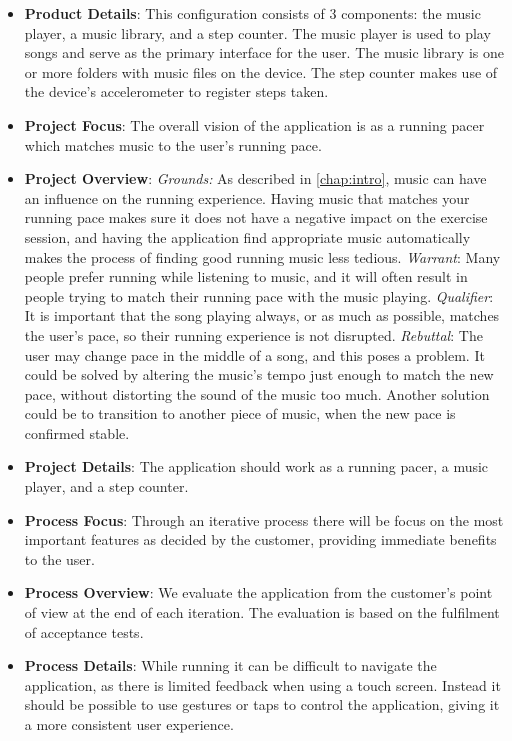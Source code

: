 \begin{itemize}
\item \textbf{Product Details}: This configuration consists of 3 components: the music player, a music library, and a step counter. The music player is used to play songs and serve as the primary interface for the user. The music library is one or more folders with music files on the device. The step counter makes use of the device's accelerometer to register steps taken.

\item \textbf{Project Focus}: The overall vision of the application is as a running pacer which matches music to the user's running pace.

\item \textbf{Project Overview}: \newline
\textit{Grounds:} As described in \cref{chap:intro}, music can have an influence on the running experience. Having music that matches your running pace makes sure it does not have a negative impact on the exercise session, and having the application find appropriate music automatically makes the process of finding good running music less tedious. \newline
\textit{Warrant}: Many people prefer running while listening to music, and it will often result in people trying to match their running pace with the music playing. \newline
\textit{Qualifier}: It is important that the song playing always, or as much as possible, matches the user's pace, so their running experience is not disrupted. \newline
\textit{Rebuttal}: The user may change pace in the middle of a song, and this poses a problem. It could be solved by altering the music's tempo just enough to match the new pace, without distorting the sound of the music too much. Another solution could be to transition to another piece of music, when the new pace is confirmed stable.

\item \textbf{Project Details}: The application should work as a running pacer, a music player, and a step counter.

\item \textbf{Process Focus}: Through an iterative process there will be focus on the most important features as decided by the customer, providing immediate benefits to the user.

\item \textbf{Process Overview}: We evaluate the application from the customer's point of view at the end of each iteration. The evaluation is based on the fulfilment of acceptance tests.

\item \textbf{Process Details}: While running it can be difficult to navigate the application, as there is limited feedback when using a touch screen. Instead it should be possible to use gestures or taps to control the application, giving it a more 
consistent user experience.
\end{itemize}